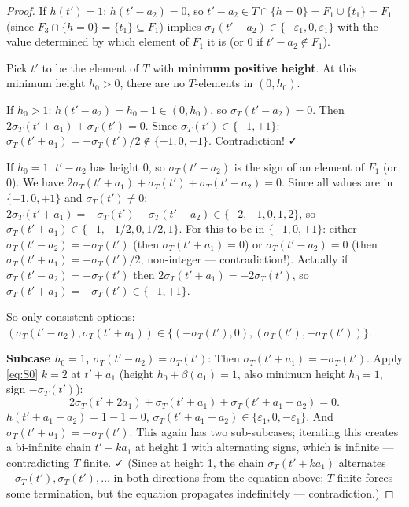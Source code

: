 \begin{proof}
If $h(t')=1$: $h(t'-a_2)=0$, so $t'-a_2 \in T\cap\{h=0\} = F_1\cup\{t_1\}=F_1$ (since $F_3\cap\{h=0\}=\{t_1\} \subseteq F_1$) implies $\sigma_T(t'-a_2) \in \{-\varepsilon_1,0,\varepsilon_1\}$ with the value determined by which element of $F_1$ it is (or $0$ if $t'-a_2 \notin F_1$).

Pick $t'$ to be the element of $T$ with \textbf{minimum positive height}. At this minimum height $h_0 > 0$, there are no $T$-elements in $(0,h_0)$.

If $h_0 > 1$: $h(t'-a_2) = h_0-1 \in (0,h_0)$, so $\sigma_T(t'-a_2)=0$. Then $2\sigma_T(t'+a_1)+\sigma_T(t')=0$. Since $\sigma_T(t') \in \{-1,+1\}$: $\sigma_T(t'+a_1) = -\sigma_T(t')/2 \notin \{-1,0,+1\}$. Contradiction! ✓

If $h_0 = 1$: $t'-a_2$ has height $0$, so $\sigma_T(t'-a_2)$ is the sign of an element of $F_1$ (or $0$). We have $2\sigma_T(t'+a_1)+\sigma_T(t')+\sigma_T(t'-a_2)=0$. Since all values are in $\{-1,0,+1\}$ and $\sigma_T(t') \neq 0$: $2\sigma_T(t'+a_1) = -\sigma_T(t')-\sigma_T(t'-a_2) \in \{-2,-1,0,1,2\}$, so $\sigma_T(t'+a_1) \in \{-1,-1/2,0,1/2,1\}$. For this to be in $\{-1,0,+1\}$: either $\sigma_T(t'-a_2) = -\sigma_T(t')$ (then $\sigma_T(t'+a_1)=0$) or $\sigma_T(t'-a_2)=0$ (then $\sigma_T(t'+a_1)=-\sigma_T(t')/2$, non-integer — contradiction!). Actually if $\sigma_T(t'-a_2)=+\sigma_T(t')$ then $2\sigma_T(t'+a_1)=-2\sigma_T(t')$, so $\sigma_T(t'+a_1)=-\sigma_T(t') \in \{-1,+1\}$.

So only consistent options: $(\sigma_T(t'-a_2), \sigma_T(t'+a_1)) \in \{(-\sigma_T(t'),0), (\sigma_T(t'), -\sigma_T(t'))\}$.

\textbf{Subcase $h_0=1$, $\sigma_T(t'-a_2)=\sigma_T(t')$}: Then $\sigma_T(t'+a_1)=-\sigma_T(t')$. Apply \eqref{eq:S0} $k=2$ at $t'+a_1$ (height $h_0+\beta(a_1)=1$, also minimum height $h_0=1$, sign $-\sigma_T(t')$):
\[
  2\sigma_T(t'+2a_1)+\sigma_T(t'+a_1)+\sigma_T(t'+a_1-a_2)=0.
\]
$h(t'+a_1-a_2) = 1 - 1 = 0$, $\sigma_T(t'+a_1-a_2) \in \{\varepsilon_1,0,-\varepsilon_1\}$. And $\sigma_T(t'+a_1)=-\sigma_T(t')$. This again has two sub-subcases; iterating this creates a bi-infinite chain $t'+ka_1$ at height 1 with alternating signs, which is infinite — contradicting $T$ finite. ✓ (Since at height 1, the chain $\sigma_T(t'+ka_1)$ alternates $-\sigma_T(t'),\sigma_T(t'),\ldots$ in both directions from the equation above; $T$ finite forces some termination, but the equation propagates indefinitely — contradiction.)


\end{proof}
